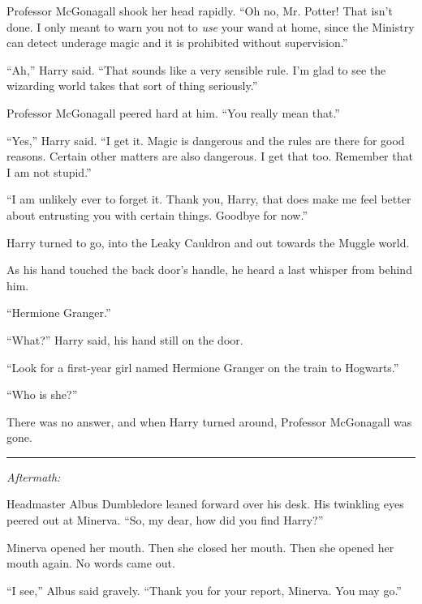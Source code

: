 Professor McGonagall shook her head rapidly. ``Oh no, Mr. Potter! That isn't done. I only meant to warn you not to \emph{use} your wand at home, since the Ministry can detect underage magic and it is prohibited without supervision.''

``Ah,'' Harry said. ``That sounds like a very sensible rule. I'm glad to see the wizarding world takes that sort of thing seriously.''

Professor McGonagall peered hard at him. ``You really mean that.''

``Yes,'' Harry said. ``I get it. Magic is dangerous and the rules are there for good reasons. Certain other matters are also dangerous. I get that too. Remember that I am not stupid.''

``I am unlikely ever to forget it. Thank you, Harry, that does make me feel better about entrusting you with certain things. Goodbye for now.''

Harry turned to go, into the Leaky Cauldron and out towards the Muggle world.

As his hand touched the back door's handle, he heard a last whisper from behind him.

``Hermione Granger.''

``What?'' Harry said, his hand still on the door.

``Look for a first-year girl named Hermione Granger on the train to Hogwarts.''

``Who is she?''

There was no answer, and when Harry turned around, Professor McGonagall was gone.

\begin{center}\rule{3in}{0.4pt}\end{center}

\emph{Aftermath:}

Headmaster Albus Dumbledore leaned forward over his desk. His twinkling eyes peered out at Minerva. ``So, my dear, how did you find Harry?''

Minerva opened her mouth. Then she closed her mouth. Then she opened her mouth again. No words came out.

``I see,'' Albus said gravely. ``Thank you for your report, Minerva. You may go.''
